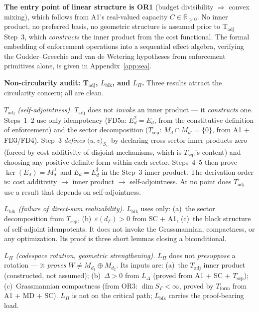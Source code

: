 \documentclass[11pt]{article}
\theoremstyle{remark}
\begin{document}
\begin{tcolorbox}[defbox, title={Linear Structure Provenance: Where Each Piece of Geometry Enters}]
\smallskip\noindent\textbf{The entry point of linear structure is OR1} (budget divisibility $\Rightarrow$ convex mixing), which follows from A1's real-valued capacity $C \in \mathbb{R}_{>0}$.  No inner product, no preferred basis, no geometric structure is assumed prior to T$_{\mathrm{adj}}$ Step~3, which \emph{constructs} the inner product from the cost functional.  The formal embedding of enforcement operations into a sequential effect algebra, verifying the Gudder--Greechie and van de Wetering hypotheses from enforcement primitives alone, is given in Appendix~\ref{app:sea}.

\smallskip\noindent\textbf{Non-circularity audit: T$_{\mathrm{adj}}$, $L_{\mathrm{blk}}$, and $L_\Pi$.}  Three results attract the circularity concern; all are clean.

\smallskip\noindent\textit{$T_{\mathrm{adj}}$ (self-adjointness).}  $T_{\mathrm{adj}}$ does not \emph{invoke} an inner product --- it \emph{constructs} one.  Steps~1--2 use only idempotency (FD5a: $E_d^2 = E_d$, from the constitutive definition of enforcement) and the sector decomposition ($T_{\mathrm{sep}}$: $M_d \cap M_{d'} = \{0\}$, from A1 + FD3/FD4).  Step~3 \emph{defines} $\langle u, v \rangle_{S_\Gamma}$ by declaring cross-sector inner products zero (forced by cost additivity of disjoint mechanisms, which is $T_{\mathrm{sep}}$'s content) and choosing any positive-definite form within each sector.  Steps~4--5 then prove $\ker(E_d) = M_d^\perp$ and $E_d = E_d^\dagger$ in the Step~3 inner product.  The derivation order is: cost additivity $\to$ inner product $\to$ self-adjointness.  At no point does $T_{\mathrm{adj}}$ use a result that depends on self-adjointness.

\smallskip\noindent\textit{$L_{\mathrm{blk}}$ (failure of direct-sum realizability).}  $L_{\mathrm{blk}}$ uses only: (a)~the sector decomposition from $T_{\mathrm{sep}}$, (b)~$\varepsilon(d_\Gamma) > 0$ from SC + A1, (c)~the block structure of self-adjoint idempotents.  It does not invoke the Grassmannian, compactness, or any optimization.  Its proof is three short lemmas closing a biconditional.

\smallskip\noindent\textit{$L_\Pi$ (codespace rotation, geometric strengthening).}  $L_\Pi$ does not \emph{presuppose} a rotation --- it \emph{proves} $W \ne M_{d_1} \oplus M_{d_2}$.  Its inputs are: (a)~the $T_{\mathrm{adj}}$ inner product (constructed, not assumed); (b)~$\Delta > 0$ from $L_\Delta$ (proved from A1 + SC + $T_{\mathrm{sep}}$); (c)~Grassmannian compactness (from OR3: $\dim S_\Gamma < \infty$, proved by $T_{\mathrm{form}}$ from A1 + MD + SC).  $L_\Pi$ is not on the critical path; $L_{\mathrm{blk}}$ carries the proof-bearing load.
\end{tcolorbox}
\end{document}
